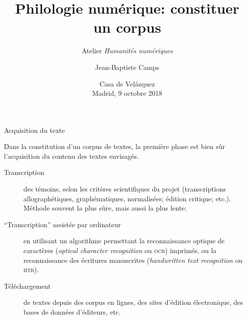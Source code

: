 \documentclass[ignorenonframetext]{beamer}
\institute{École nationale des chartes | Paris, Sciences \& Lettres}
\title{Philologie numérique: constituer un corpus}
\subtitle{Atelier \textit{Humanités numériques}}
\author{Jean-Baptiste Camps}
\date[Madrid, 9 oct. 2018]{Casa de Velázquez\\ Madrid, 9 octobre 2018}
\begin{document}
\frame{\maketitle}



\begin{frame}{Acquisition du texte}

Dans la constitution d'un corpus de textes, la première phase est bien sûr l'acquisition du contenu des textes envisagés.
\begin{description}
	\item[Transcription] des témoins, selon les critères scientifiques du projet (transcriptions allographétiques, graphématiques, normalisées; édition critique; etc.). Méthode souvent la plus sûre, mais aussi la plus lente;
	\item[``Transcription'' assistée par ordinateur] en utilisant un algorithme permettant la reconnaissance optique de caractères (\textit{optical character recognition} ou \textsc{ocr}) imprimés, ou la reconnaissance des écritures manuscrites (\textit{handwritten text recognition} ou \textsc{htr}).
	\item[Téléchargement] de textes depuis des corpus en lignes, des sites d'édition électronique, des bases de données d'éditeurs, etc.
\end{description}

\end{frame}
\end{document}
